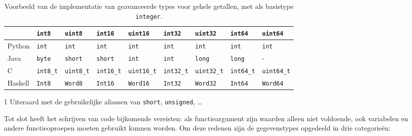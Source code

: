\begin{table}
    \centering
    \caption{Voorbeeld van de implementatie van geavanceerde types voor gehele getallen, met als basistype \texttt{integer}.}
    \label{tab:vertaling}
    \begin{threeparttable}
        \begin{tabular}{|l|llllllll|}
            \hline
            & \texttt{int8} & \texttt{uint8} & \texttt{int16} & \texttt{uint16} & \texttt{int32} & \texttt{uint32} & \texttt{int64} & \texttt{uint64} \\
            \hline
            Python     & \texttt{int}  & \texttt{int}   & \texttt{int}   & \texttt{int}    & \texttt{int}   & \texttt{int}    & \texttt{int}   & \texttt{int}    \\
            Java       & \texttt{byte} & \texttt{short} & \texttt{short} & \texttt{int}    & \texttt{int}   & \texttt{long}   & \texttt{long}  & -               \\
            C\tnote{1} & \texttt{int8\_t} & \texttt{uint8\_t} & \texttt{int16\_t} & \texttt{uint16\_t} & \texttt{int32\_t} & \texttt{uint32\_t} & \texttt{int64\_t} & \texttt{uint64\_t} \\
            Haskell    & \texttt{Int8} & \texttt{Word8} & \texttt{Int16} & \texttt{Word16} & \texttt{Int32} & \texttt{Word32} & \texttt{Int64} & \texttt{Word64} \\
            \hline
        \end{tabular}
        \begin{tablenotes}
            \item[1] Uiteraard met de gebruikelijke aliassen van \texttt{short}, \texttt{unsigned}, \ldots
        \end{tablenotes}
    \end{threeparttable}
\end{table}

Tot slot heeft het schrijven van code bijkomende vereisten: als functieargument zijn waarden alleen niet voldoende, ook variabelen en andere functieoproepen moeten gebruikt kunnen worden.
Om deze redenen zijn de gegevenstypes opgedeeld in drie categorieën:

